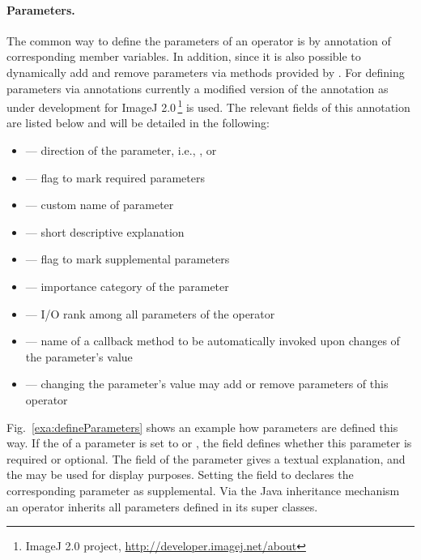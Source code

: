 \paragraph{Parameters.}
The common way to define the parameters of an operator is by annotation of
corresponding member variables. In addition, since  it is also possible to
dynamically add and remove parameters via methods provided by . For defining
parameters via annotations currently a modified version of the annotation  as under development for ImageJ
2.0$\,$\footnote{ImageJ 2.0 project, \url{http://developer.imagej.net/about}} is used.
The relevant fields of this annotation are listed below and will be detailed in
the following:
\begin{itemize}
\item	{} --- direction of the parameter, i.e., ,
 or 
\item	{} --- flag to mark required parameters
\item	{} --- custom name of parameter
\item	{} --- short descriptive explanation
\item	{} --- flag to mark supplemental parameters
\item	{} --- importance category of the parameter
\item	{} --- I/O rank among all parameters of the operator
\item	{} --- name of a callback method to be automatically
 invoked upon changes of the parameter's value
\item	{} --- changing the parameter's value
 may add or remove parameters of this operator
\end{itemize}

Fig.~\ref{exa:defineParameters} shows an example how parameters are defined this way.
If the  of a parameter is set to  or
, the field  defines whether this parameter is
required or optional. 
The field 
of the parameter gives a textual explanation, and the  may be
used for display purposes.
Setting the field  to  declares the
corresponding parameter as supplemental.
Via the Java inheritance mechanism an operator inherits all parameters defined
in its super classes.

